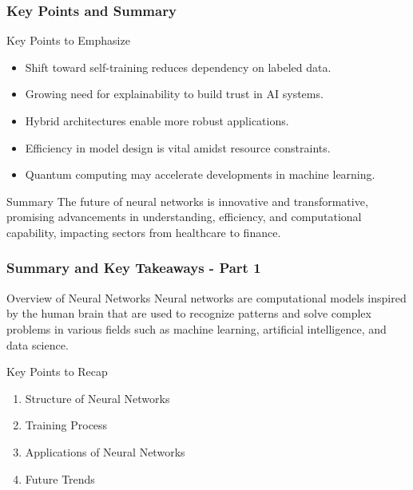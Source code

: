 \documentclass[aspectratio=169]{beamer}
\begin{document}
\begin{frame}[fragile]
    \frametitle{Key Points and Summary}
    \begin{block}{Key Points to Emphasize}
        \begin{itemize}
            \item Shift toward self-training reduces dependency on labeled data.
            \item Growing need for explainability to build trust in AI systems.
            \item Hybrid architectures enable more robust applications.
            \item Efficiency in model design is vital amidst resource constraints.
            \item Quantum computing may accelerate developments in machine learning.
        \end{itemize}
    \end{block}

    \begin{block}{Summary}
        The future of neural networks is innovative and transformative, promising advancements in understanding, efficiency, and computational capability, impacting sectors from healthcare to finance.
    \end{block}
\end{frame}

\begin{frame}[fragile]
  \frametitle{Summary and Key Takeaways - Part 1}
  \begin{block}{Overview of Neural Networks}
    Neural networks are computational models inspired by the human brain that are used to recognize patterns and solve complex problems in various fields such as machine learning, artificial intelligence, and data science.
  \end{block}

  \begin{block}{Key Points to Recap}
    \begin{enumerate}
      \item Structure of Neural Networks
      \item Training Process
      \item Applications of Neural Networks
      \item Future Trends
    \end{enumerate}
  \end{block}
\end{frame}
\end{document}
